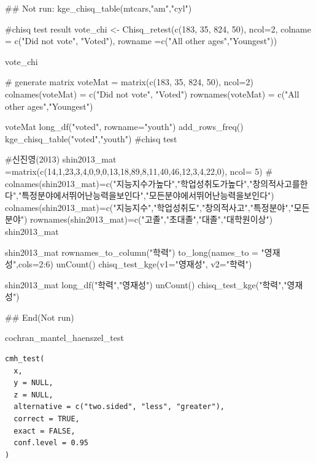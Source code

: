 \documentclass[a4paper]{book}
\begin{document}
\begin{Examples}
\begin{ExampleCode}

\#\# Not run: 
kge_chisq_table(mtcars,"am","cyl")


#chisq test result
vote_chi <- Chisq_retest(c(183, 35, 824, 50), ncol=2,
                        colname = c("Did not vote", "Voted"),
                         rowname =c("All other ages","Youngest"))

vote_chi


# generate matrix
voteMat = matrix(c(183, 35, 824, 50), ncol=2)
colnames(voteMat) = c("Did not vote", "Voted")
rownames(voteMat) = c("All other ages","Youngest")

voteMat%
  long_df("voted", rowname="youth")%
  add_rows_freq() %
  kge_chisq_table("voted","youth")    #chisq test


#신진영(2013)
shin2013_mat =matrix(c(14,1,23,3,4,0,9,0,13,18,89,8,11,40,46,12,3,4,22,0), ncol= 5)
# colnames(shin2013_mat)=c("지능지수가높다","학업성취도가높다","창의적사고를한다","특정분야에서뛰어난능력을보인다","모든분야에서뛰어난능력을보인다")
colnames(shin2013_mat)=c("지능지수","학업성취도","창의적사고","특정분야","모든분야")
rownames(shin2013_mat)=c("고졸","초대졸","대졸","대학원이상")
shin2013_mat

shin2013_mat %
  rownames_to_column("학력") %
  to_long(names_to = "영재성",cols=2:6) %
  unCount() %
  chisq_test_kge(v1="영재성", v2="학력")


shin2013_mat%
  long_df("학력","영재성") %
  unCount() %
  chisq_test_kge("학력","영재성")


## End(Not run)
\end{ExampleCode}
\end{Examples}
%
\begin{Description}
cochran\_mantel\_haenszel\_test
\end{Description}
%
\begin{Usage}
\begin{verbatim}
cmh_test(
  x,
  y = NULL,
  z = NULL,
  alternative = c("two.sided", "less", "greater"),
  correct = TRUE,
  exact = FALSE,
  conf.level = 0.95
)
\end{verbatim}
\end{Usage}
%
\end{document}
